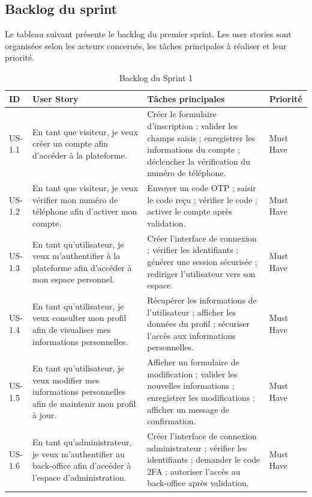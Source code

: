 \subsection{Backlog du sprint}


Le tableau suivant présente le backlog du premier sprint. Les user stories sont organisées selon les acteurs concernés, les tâches principales à réaliser et leur priorité.


\begin{table}[H]
\centering
\caption{Backlog du Sprint 1}
\label{tableau:3-1}
\renewcommand{\arraystretch}{1.2}
\begin{tabularx}{\textwidth}{|>{\raggedright\arraybackslash}X|>{\raggedright\arraybackslash}X|>{\raggedright\arraybackslash}X|>{\raggedright\arraybackslash}X|}
\hline
\rowcolor[HTML]{ECF4FF}
\textbf{ID} & \textbf{User Story} & \textbf{Tâches principales} & \textbf{Priorité} \\
\hline
US-1.1 & En tant que visiteur, je veux créer un compte afin d’accéder à la plateforme. & Créer le formulaire d’inscription ; valider les champs saisis ; enregistrer les informations du compte ; déclencher la vérification du numéro de téléphone. & Must Have \\
\hline
US-1.2 & En tant que visiteur, je veux vérifier mon numéro de téléphone afin d’activer mon compte. & Envoyer un code OTP ; saisir le code reçu ; vérifier le code ; activer le compte après validation. & Must Have \\
\hline
US-1.3 & En tant qu’utilisateur, je veux m’authentifier à la plateforme afin d’accéder à mon espace personnel. & Créer l’interface de connexion ; vérifier les identifiants ; générer une session sécurisée ; rediriger l’utilisateur vers son espace. & Must Have \\
\hline
US-1.4 & En tant qu’utilisateur, je veux consulter mon profil afin de visualiser mes informations personnelles. & Récupérer les informations de l’utilisateur ; afficher les données du profil ; sécuriser l’accès aux informations personnelles. & Must Have \\
\hline
US-1.5 & En tant qu’utilisateur, je veux modifier mes informations personnelles afin de maintenir mon profil à jour. & Afficher un formulaire de modification ; valider les nouvelles informations ; enregistrer les modifications ; afficher un message de confirmation. & Must Have \\
\hline
US-1.6 & En tant qu’administrateur, je veux m’authentifier au back-office afin d’accéder à l’espace d’administration. & Créer l’interface de connexion administrateur ; vérifier les identifiants ; demander le code 2FA ; autoriser l’accès au back-office après validation. & Must Have \\
\hline
\end{tabularx}
\end{table}



